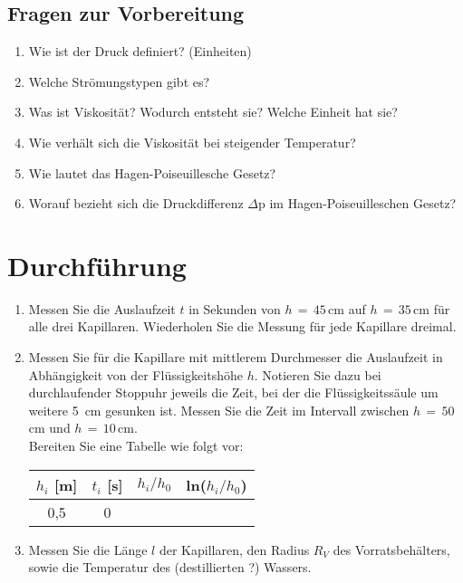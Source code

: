 \begin{tutorhint}
\section{Fragen zur Vorbereitung}

\begin{enumerate}
 \item Wie ist der Druck definiert? (Einheiten)
 \item Welche Strömungstypen gibt es?
 \item Was ist Viskosität? Wodurch entsteht sie? Welche Einheit hat sie?
 \item Wie verhält sich die Viskosität bei steigender Temperatur?
 \item Wie lautet das Hagen-Poiseuillesche Gesetz?
 \item Worauf bezieht sich die Druckdifferenz $\Delta$p im Hagen-Poiseuilleschen Gesetz?
\end{enumerate}
\end{tutorhint}

\section{Durchführung} 

\begin{enumerate}
 \item Messen Sie die Auslaufzeit $t$ in Sekunden von $h\,=\,45\,$cm auf $h\,=\,35\,$cm für alle drei Kapillaren. Wiederholen Sie die Messung für jede Kapillare dreimal.
 \item Messen Sie für die Kapillare mit mittlerem Durchmesser die Auslaufzeit in Abhängigkeit von der Flüssigkeitshöhe $h$. Notieren Sie dazu bei durchlaufender Stoppuhr jeweils die Zeit, bei der die Flüssigkeitssäule um weitere 5~cm gesunken ist. Messen Sie die Zeit im Intervall zwischen $h\,=\,50\,$cm und $h\,=\,10\,$cm.\\
 Bereiten Sie eine Tabelle wie folgt vor:
 \begin{table}[h]
	\centering
		\begin{tabular}{|c|c|c|c|}
			$h_i$ [m] & $t_i$ [s] & $h_i/h_0$ & ln($h_i/h_0$)\\ \hline \hline
			0,5 & 0 & & \\
		\end{tabular}
 \end{table}
 \item Messen Sie die Länge $l$ der Kapillaren, den Radius $R_V$ des Vorratsbehälters, sowie die Temperatur des (destillierten ?) Wassers.
\end{enumerate}

